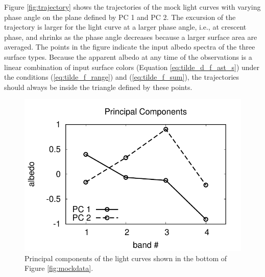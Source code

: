 \documentclass[iop,numberedappendix,apj,]{emulateapj}
\begin{document}
Figure \ref{fig:trajectory} shows the trajectories of the mock light curves with varying phase angle on the plane defined by PC 1 and PC 2. 
The excursion of the trajectory is larger for the light curve at a larger phase angle, i.e., at crescent phase, and shrinks as the phase angle decreases because a larger surface area are averaged. 
The points in the figure indicate the input albedo spectra of the three surface types. 
Because the apparent albedo at any time of the observations is a linear combination of input surface colors (Equation \ref{eq:tilde_d_f_ast_s}) under the conditions (\ref{eq:tilde_f_range}) and (\ref{eq:tilde_f_sum}), the trajectories should always be inside the triangle defined by these points.  
 
\begin{figure}[tbh!]
    \begin{center}
\includegraphics[width=\hsize]{PCA_V_jn.pdf}
    \end{center}
    \caption{Principal components of the light curves shown in the bottom of Figure \ref{fig:mockdata}. }
\label{fig:PCs}
\end{figure}
\end{document}
